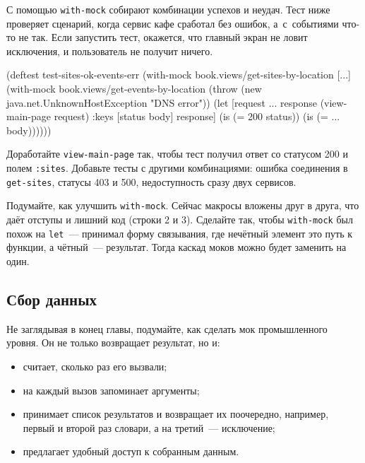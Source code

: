 С помощью \verb|with-mock| собирают комбинации успехов и неудач. Тест ниже
проверяет сценарий, когда сервис кафе сработал без ошибок, а~с~событиями что-то
не так. Если запустить тест, окажется, что главный экран не ловит исключения, и
пользователь не получит ничего.

\begin{english}
  \begin{clojure/lines}
(deftest test-sites-ok-events-err
  (with-mock book.views/get-sites-by-location [...]
    (with-mock book.views/get-events-by-location
      (throw (new java.net.UnknownHostException "DNS error"))
      (let [request {...}
            response (view-main-page request)
            {:keys [status body]} response]
        (is (= 200 status))
        (is (= {...} body))))))
  \end{clojure/lines}
\end{english}

Доработайте \verb|view-main-page| так, чтобы тест получил ответ со статусом
200 и полем \verb|:sites|. Добавьте тесты с другими комбинациями: ошибка
соединения в \verb|get-sites|, статусы 403 и 500, недоступность сразу двух
сервисов.

Подумайте, как улучшить \verb|with-mock|. Сейчас макросы вложены друг в друга,
что даёт отступы и лишний код (строки 2 и 3). Сделайте так, чтобы
\verb|with-mock| был похож на \verb|let|~--- принимал форму связывания, где
нечётный элемент это путь к функции, а чётный~--- результат. Тогда каскад моков
можно будет заменить на один.

\subsection{Сбор данных}


Не заглядывая в конец главы, подумайте, как сделать мок промышленного уровня. Он
не только возвращает результат, но и:

\begin{itemize}

\item
  считает, сколько раз его вызвали;

\item
  на каждый вызов запоминает аргументы;

\item
  принимает список результатов и возвращает их поочередно, например, первый и
  второй раз словари, а на третий~--- исключение;

\item
  предлагает удобный доступ к собранным данным.

\end{itemize}

